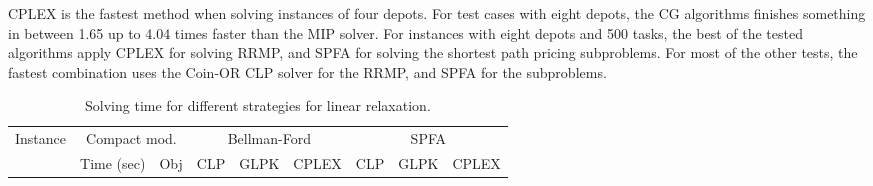 \documentclass{article}
\begin{document}
CPLEX is the fastest method when solving instances of four depots. For test cases with eight depots, the CG algorithms finishes something in between 1.65 up to 4.04 times faster than the MIP solver. For instances with eight depots and 500 tasks, the best of the tested algorithms apply CPLEX for solving RRMP, and SPFA for solving the shortest path pricing subproblems. For most of the other tests, the fastest combination uses the Coin-OR CLP solver for the RRMP, and SPFA for the subproblems.

\begin{table}[!htb]
   \scriptsize
   \tabcolsep=3.5pt
   \caption{Solving time for different strategies for linear relaxation.}
   \label{table:sp-algos}
   \centering
   \begin{tabular}{rrrrrrrrr}
      \toprule

      \multirow{2}{*}{Instance} &
      \multicolumn{2}{c}{Compact mod.} &
      \multicolumn{3}{c}{Bellman-Ford} &
      \multicolumn{3}{c}{SPFA}\\

      \cmidrule(lr){2-3}
      \cmidrule(lr){4-6}
      \cmidrule(lr){7-9}

      &
      Time (sec) & Obj &
      CLP &
      GLPK &
      CPLEX &
      CLP &
      GLPK &
      CPLEX \\

      \midrule


\end{tabular}
\end{table}
\end{document}
